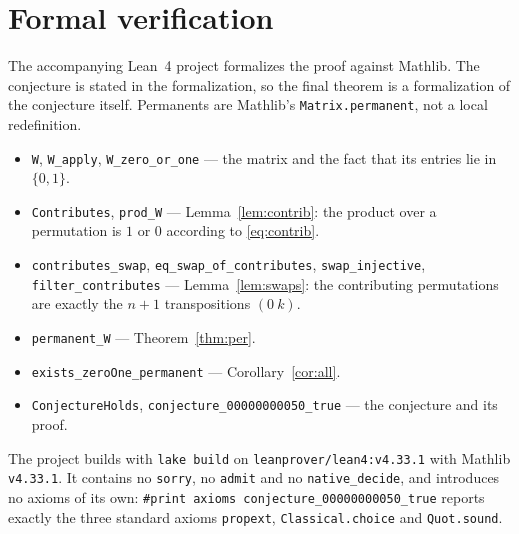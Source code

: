\documentclass[11pt]{article}
\theoremstyle{plain}
\theoremstyle{definition}
\theoremstyle{remark}
\begin{document}
\section{Formal verification}

The accompanying Lean~4 project formalizes the proof against Mathlib. The
conjecture is stated in the formalization, so the final theorem is a
formalization of the conjecture itself. Permanents are Mathlib's
\texttt{Matrix.permanent}, not a local redefinition.

\begin{itemize}
  \item \texttt{W}, \texttt{W\_apply}, \texttt{W\_zero\_or\_one} --- the matrix
    and the fact that its entries lie in $\{0,1\}$.
  \item \texttt{Contributes}, \texttt{prod\_W} --- Lemma~\ref{lem:contrib}: the
    product over a permutation is $1$ or $0$ according to \eqref{eq:contrib}.
  \item \texttt{contributes\_swap}, \texttt{eq\_swap\_of\_contributes},
    \texttt{swap\_injective}, \texttt{filter\_contributes} ---
    Lemma~\ref{lem:swaps}: the contributing permutations are exactly the
    $n+1$ transpositions $(0\ k)$.
  \item \texttt{permanent\_W} --- Theorem~\ref{thm:per}.
  \item \texttt{exists\_zeroOne\_permanent} --- Corollary~\ref{cor:all}.
  \item \texttt{ConjectureHolds}, \texttt{conjecture\_00000000050\_true} ---
    the conjecture and its proof.
\end{itemize}

The project builds with \texttt{lake build} on
\texttt{leanprover/lean4:v4.33.1} with Mathlib \texttt{v4.33.1}. It contains no
\texttt{sorry}, no \texttt{admit} and no \texttt{native\_decide}, and
introduces no axioms of its own:
\texttt{\#print axioms conjecture\_00000000050\_true} reports exactly the three
standard axioms \texttt{propext}, \texttt{Classical.choice} and
\texttt{Quot.sound}.
\end{document}
